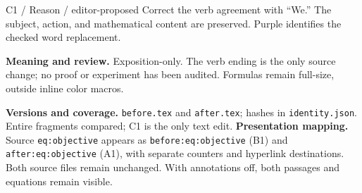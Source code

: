 \documentclass[11pt]{article}
\begin{document}
\ifrcannotations
\begin{rcContext}{C1 / Reason / editor-proposed}
Correct the verb agreement with ``We.'' The subject, action, and mathematical
content are preserved. Purple identifies the checked word replacement.
\end{rcContext}
\fi
{\small\textbf{Meaning and review.} Exposition-only. The verb ending is the only
source change; no proof or experiment has been audited. Formulas remain
full-size, outside inline color macros.}

{\footnotesize\color{rcMuted}\textbf{Versions and coverage.} \texttt{before.tex}
and \texttt{after.tex}; hashes in \texttt{identity.json}. Entire fragments
compared; C1 is the only text edit.
\textbf{Presentation mapping.} Source \texttt{eq:objective} appears as
\texttt{before:eq:objective} (B1) and \texttt{after:eq:objective} (A1), with
separate counters and hyperlink destinations. Both source files remain
unchanged. With annotations off, both passages and equations remain visible.}
\end{document}
